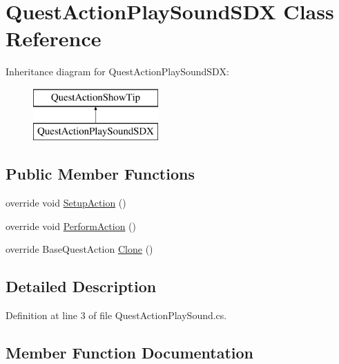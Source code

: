 \hypertarget{class_quest_action_play_sound_s_d_x}{}\section{Quest\+Action\+Play\+Sound\+S\+DX Class Reference}
\label{class_quest_action_play_sound_s_d_x}
Inheritance diagram for Quest\+Action\+Play\+Sound\+S\+DX\+:\begin{figure}[H]
\begin{center}
\leavevmode
\includegraphics[height=2.000000cm]{d7/dd3/class_quest_action_play_sound_s_d_x}
\end{center}
\end{figure}
\subsection*{Public Member Functions}
\begin{DoxyCompactItemize}
\item 
override void \mbox{\hyperlink{class_quest_action_play_sound_s_d_x_a887c9ac83758b008b58939209df166ec}{Setup\+Action}} ()
\item 
override void \mbox{\hyperlink{class_quest_action_play_sound_s_d_x_a388750909751148ff6b1d7cac8d71c6e}{Perform\+Action}} ()
\item 
override Base\+Quest\+Action \mbox{\hyperlink{class_quest_action_play_sound_s_d_x_a697994edb028af4b3ffd872de05d5053}{Clone}} ()
\end{DoxyCompactItemize}


\subsection{Detailed Description}


Definition at line 3 of file Quest\+Action\+Play\+Sound.\+cs.



\subsection{Member Function Documentation}
\mbox{\label{class_quest_action_play_sound_s_d_x_a697994edb028af4b3ffd872de05d5053}} 
